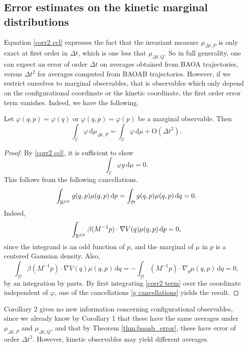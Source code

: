 \subsection{Error estimates on the kinetic marginal distributions}\label{second order on the marginals}
Equation \eqref{corr2 ccl} expresses the fact that the invariant measure $\mu_{\Delta t,P}$ is only exact at first order in $\Delta t$, which is one less that $\mu_{\Delta t,Q}$.
So in full generality, one can expect an error of order $\Delta t$ on averages obtained from BAOA trajectories, versus $\Delta t^2$ for averages computed from BAOAB trajectories. However, if we restrict ourselves to marginal observables, that is observables which only depend on the configurational coordinate or the kinetic coordinate, the first order error term vanishes.
Indeed, we have the following.
\begin{corollary}\label{corr3 second order marginals}
Let $\varphi(q,p)=\varphi(q)$ or $\varphi(q,p)=\varphi(p)$ be a marginal observable. Then
$$\int_{\mathcal E}\varphi\, \mathrm{d} \mu_{\Delta t,P}=\int_{\mathcal E}\varphi\, \mathrm{d}\mu +\mathrm{O}(\Delta t^2).$$
\end{corollary}
\begin{proof}
  By \eqref{corr2 ccl}, it is sufficient to show
  \begin{equation}\label{corr2 term}\int_{\mathcal E}\varphi g\, \mathrm{d}\mu=0.\end{equation}
  This follows from the following cancellations.
  \begin{equation}
    \label{g cancellations}
      \int_{\mathbb{R}^{dN}}g(q,p)\mu(q,p)\,\mathrm{d}p=\int_{\mathcal D}g(q,p)\mu(q,p)\,\mathrm{d}q=0.
  \end{equation}
  Indeed,
  $$\int_{\mathbb{R}^{dN}}\beta (M^{-1}p)\cdot \nabla V(q)\mu(q,p)\,\mathrm{d}p=0,$$
since the integrand is an odd function of $p$, and the marginal of $\mu$ in $p$ is a centered Gaussian density. Also,
$$\int_{\mathcal D}\beta(M^{-1}p)\cdot \nabla V(q)\mu(q,p)\,\mathrm{d}q=-\int_{\mathcal D}(M^{-1}p)\cdot \nabla_q\mu(q,p)\,\mathrm{d}q=0,$$
by an integration by parts. By first integrating \eqref{corr2 term} over the coordinate independent of $\varphi$, one of the cancellations \eqref{g cancellations} yields the result.
\end{proof}

Corollary 2 gives no new information concerning configurational observables, since we already know by Corollary 1 that these have the same averages under $\mu_{\Delta t,P}$ and $\mu_{\Delta t,Q}$, and that by Theorem \ref{thm:baoab_error}, these have error of order $\Delta t^2$.
However, kinetic observables may yield different averages.

